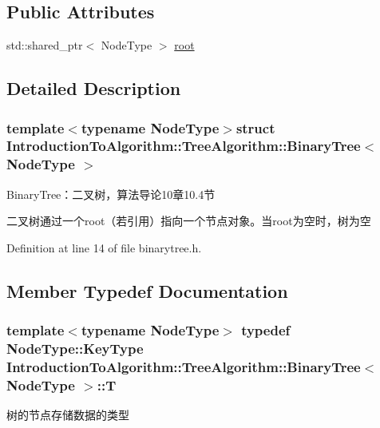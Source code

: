 \subsection*{Public Attributes}
\begin{DoxyCompactItemize}
\item 
std\+::shared\+\_\+ptr$<$ Node\+Type $>$ \hyperlink{struct_introduction_to_algorithm_1_1_tree_algorithm_1_1_binary_tree_a81c2f14ccd7e44e3bb305c66cef417bd}{root}
\end{DoxyCompactItemize}


\subsection{Detailed Description}
\subsubsection*{template$<$typename Node\+Type$>$struct Introduction\+To\+Algorithm\+::\+Tree\+Algorithm\+::\+Binary\+Tree$<$ Node\+Type $>$}

Binary\+Tree：二叉树，算法导论10章10.4节 

二叉树通过一个root（若引用）指向一个节点对象。当root为空时，树为空 

Definition at line 14 of file binarytree.\+h.



\subsection{Member Typedef Documentation}
\hypertarget{struct_introduction_to_algorithm_1_1_tree_algorithm_1_1_binary_tree_aca34063e8bc88ed0dde8c706c337c3d6}{}
\subsubsection[{T}]{\setlength{\rightskip}{0pt plus 5cm}template$<$typename Node\+Type$>$ typedef Node\+Type\+::\+Key\+Type {\bf Introduction\+To\+Algorithm\+::\+Tree\+Algorithm\+::\+Binary\+Tree}$<$ Node\+Type $>$\+::{\bf T}}\label{struct_introduction_to_algorithm_1_1_tree_algorithm_1_1_binary_tree_aca34063e8bc88ed0dde8c706c337c3d6}
树的节点存储数据的类型 

